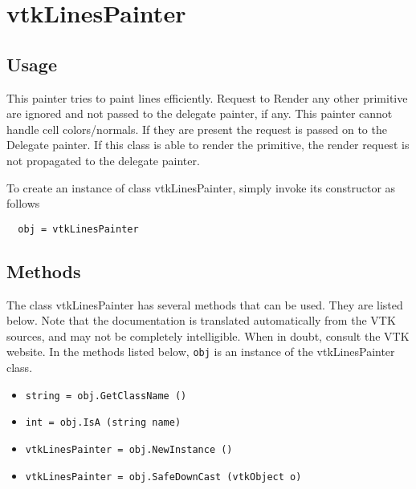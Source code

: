 \section{vtkLinesPainter}

\subsection{Usage}

 This painter tries to paint lines efficiently. Request to Render
 any other primitive are ignored and not passed to the delegate painter, 
 if any. This painter cannot handle cell colors/normals. If they are 
 present the request is passed on to the Delegate painter. If this 
 class is able to render the primitive, the render request is not
 propagated to the delegate painter.
 

To create an instance of class vtkLinesPainter, simply
invoke its constructor as follows
\begin{verbatim}
  obj = vtkLinesPainter
\end{verbatim}
\subsection{Methods}

The class vtkLinesPainter has several methods that can be used.
  They are listed below.
Note that the documentation is translated automatically from the VTK sources,
and may not be completely intelligible.  When in doubt, consult the VTK website.
In the methods listed below, \verb|obj| is an instance of the vtkLinesPainter class.
\begin{itemize}
\item  \verb|string = obj.GetClassName ()|

\item  \verb|int = obj.IsA (string name)|

\item  \verb|vtkLinesPainter = obj.NewInstance ()|

\item  \verb|vtkLinesPainter = obj.SafeDownCast (vtkObject o)|

\end{itemize}
